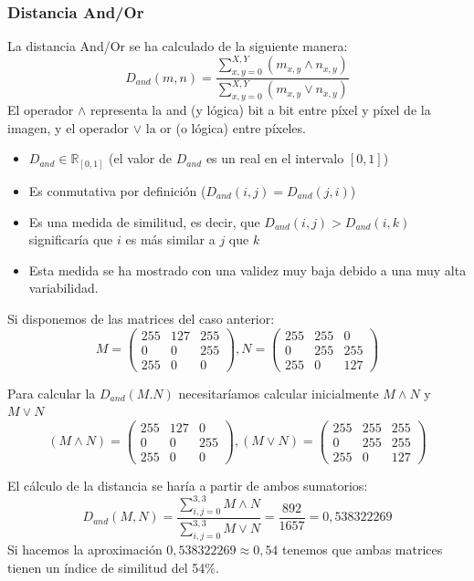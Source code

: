 \subsubsection{Distancia And/Or}
La distancia And/Or se ha calculado de la siguiente manera:
\[
D_{and}(m,n)=\frac{ \sum_{x,y=0}^{X,Y}(m_{x,y} \wedge n_{x,y}) }{ \sum_{x,y=0}^{X,Y}(m_{x,y} \vee n_{x,y}) }
\]
El operador $\wedge$ representa la and (y lógica) bit a bit entre píxel y píxel de la imagen, y el operador $\vee$ la or (o lógica) entre píxeles. 
\begin{itemize}
	\item{$D_{and}\in\mathbb{R}_{\left[0,1\right]}$ (el valor de $D_{and}$ es un real en el intervalo $\left[0,1\right]$)} 
	\item{Es conmutativa por definición ($D_{and}(i,j)=D_{and}(j,i)$)}
	\item{Es una medida de similitud, es decir, que $D_{and}(i,j) > D_{and} (i,k)$ significaría que $i$ es más similar a $j$ que $k$}
	\item{Esta medida se ha mostrado con una validez muy baja debido a una muy alta variabilidad.}
\end{itemize}

Si disponemos de las matrices del caso anterior:
\[ M=\left( \begin{array}{lcr}
	255 & 127 & 255 \\
	0 & 0 & 255 \\
	255 & 0 & 0 
\end{array} \right), N=\left( \begin{array}{lcr}
	255 & 255 & 0 \\
	0 & 255 & 255 \\
	255 & 0 & 127 
\end{array} \right) 
\]

Para calcular la $D_{and}(M.N)$ necesitaríamos calcular inicialmente $M \wedge N$ y $M \vee N$
\[ (M \wedge N)=\left( \begin{array}{lcr}
	255 & 127 & 0 \\
	0 & 0 & 255 \\
	255 & 0 & 0 
\end{array} \right), (M \vee N)=\left( \begin{array}{lcr}
	255 & 255 & 255 \\
	0 & 255 & 255 \\
	255 & 0 & 127 
\end{array} \right) 
\]

El cálculo de la distancia se haría a partir de ambos sumatorios:
\[D_{and}(M,N) = \frac 
	{\sum_{i,j=0}^{3,3} M \wedge N} 
	{\sum_{i,j=0}^{3,3} M \vee N} = \frac {892}{1657} = 0,538322269 
\]
Si hacemos la aproximación $ 0,538322269 \approx 0,54 $ tenemos que ambas matrices tienen un índice de similitud del 54\%.


